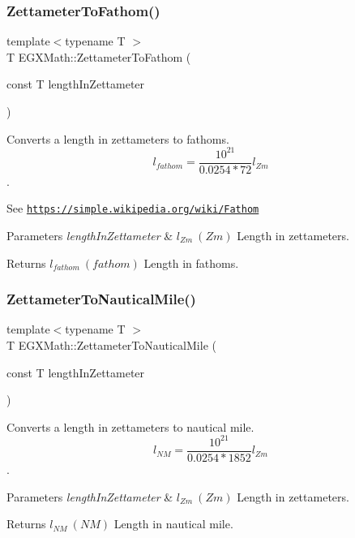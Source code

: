\subsubsection{\texorpdfstring{Zettameter\+To\+Fathom()}{ZettameterToFathom()}}
{\footnotesize\ttfamily template$<$typename T $>$ \\
T E\+G\+X\+Math\+::\+Zettameter\+To\+Fathom (\begin{DoxyParamCaption}\item[{const T}]{length\+In\+Zettameter }\end{DoxyParamCaption})}



Converts a length in zettameters to fathoms. \[ l_{fathom}= \frac{10^{21}}{0.0254 * 72} l_{Zm} \]. 

See \href{https://simple.wikipedia.org/wiki/Fathom}{\tt https\+://simple.\+wikipedia.\+org/wiki/\+Fathom} 
\begin{DoxyParams}{Parameters}
{\em length\+In\+Zettameter} & $ l_{Zm}\ (Zm)$ Length in zettameters. \\
\hline
\end{DoxyParams}
\begin{DoxyReturn}{Returns}
$ l_{fathom}\ (fathom)$ Length in fathoms. 
\end{DoxyReturn}
\mbox{\label{group___e_g_x_math-_conversions-_length_conversions-_s_i-_zettameter-_nautical_ga474eb2cb88740b3dd9e13fa6e8aa4558}} 
\subsubsection{\texorpdfstring{Zettameter\+To\+Nautical\+Mile()}{ZettameterToNauticalMile()}}
{\footnotesize\ttfamily template$<$typename T $>$ \\
T E\+G\+X\+Math\+::\+Zettameter\+To\+Nautical\+Mile (\begin{DoxyParamCaption}\item[{const T}]{length\+In\+Zettameter }\end{DoxyParamCaption})}



Converts a length in zettameters to nautical mile. \[ l_{NM}= \frac{10^{21}}{0.0254 * 1852} l_{Zm} \]. 


\begin{DoxyParams}{Parameters}
{\em length\+In\+Zettameter} & $ l_{Zm}\ (Zm)$ Length in zettameters. \\
\hline
\end{DoxyParams}
\begin{DoxyReturn}{Returns}
$ l_{NM}\ (NM)$ Length in nautical mile. 
\end{DoxyReturn}
